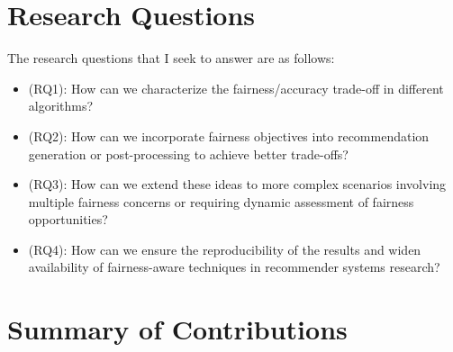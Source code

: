 

\section{Research Questions}

The research questions that I seek to answer are as follows:
\begin{itemize}
    \item (RQ1): How can we characterize the fairness/accuracy trade-off in different algorithms?
    \item (RQ2): How can we incorporate fairness objectives into recommendation generation or post-processing to achieve better trade-offs? %
    \item (RQ3): How can we extend these ideas to more complex scenarios involving multiple fairness concerns or requiring dynamic assessment of fairness opportunities? %
    \item (RQ4): How can we ensure the reproducibility of the results and widen availability of fairness-aware techniques in recommender systems research? %
\end{itemize}


\section{Summary of Contributions}

